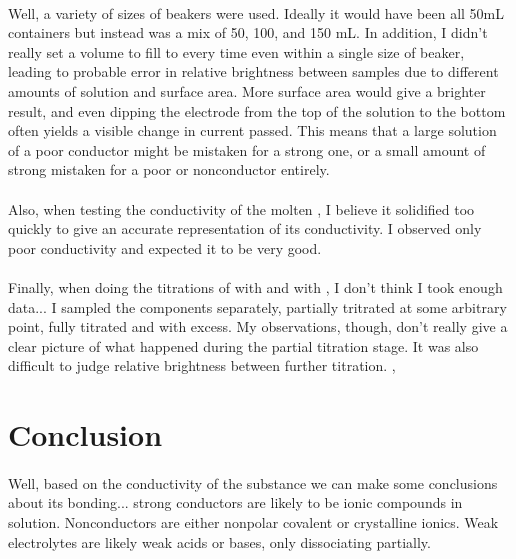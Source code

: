 \documentclass[fleqn,titlepage]{article}
\begin{document}
  \paragraph{} Well, a variety of sizes of beakers were used. Ideally it would have been all 50mL containers but instead was a mix of 50, 100, and 150 mL. In addition, I didn't really set a volume to fill to every time even within a single size of beaker, leading to probable error in relative brightness between samples due to different amounts of solution and surface area. More surface area would give a brighter result, and even dipping the electrode from the top of the solution to the bottom often yields a visible change in current passed. This means that a large solution of a poor conductor might be mistaken for a strong one, or a small amount of strong mistaken for a poor or nonconductor entirely.
  \paragraph{} Also, when testing the conductivity of the molten , I believe it solidified too quickly to give an accurate representation of its conductivity. I observed only poor conductivity and expected it to be very good.
  \paragraph{} Finally, when doing the titrations of  with  and  with , I don't think I took enough data... I sampled the components separately, partially tritrated at some arbitrary point, fully titrated and with excess. My observations, though, don't really give a clear picture of what happened during the partial titration stage. It was also difficult to judge relative brightness between further titration.
, 
\section*{Conclusion}
  \paragraph{} Well, based on the conductivity of the substance we can make some conclusions about its bonding... strong conductors are likely to be ionic compounds in solution. Nonconductors are either nonpolar covalent or crystalline ionics. Weak electrolytes are likely weak acids or bases, only dissociating partially.
\end{document}
